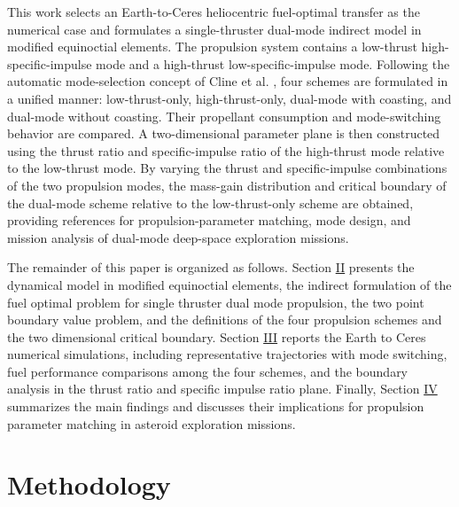 ﻿\documentclass{IEEEtaes}
\begin{document}
This work selects an Earth-to-Ceres heliocentric fuel-optimal transfer as the numerical case and formulates a single-thruster dual-mode indirect model in modified equinoctial elements. The propulsion system contains a low-thrust high-specific-impulse mode and a high-thrust low-specific-impulse mode. Following the automatic mode-selection concept of Cline et al. \cite{cline2024a}, four schemes are formulated in a unified manner: low-thrust-only, high-thrust-only, dual-mode with coasting, and dual-mode without coasting. Their propellant consumption and mode-switching behavior are compared. A two-dimensional parameter plane is then constructed using the thrust ratio and specific-impulse ratio of the high-thrust mode relative to the low-thrust mode. By varying the thrust and specific-impulse combinations of the two propulsion modes, the mass-gain distribution and critical boundary of the dual-mode scheme relative to the low-thrust-only scheme are obtained, providing references for propulsion-parameter matching, mode design, and mission analysis of dual-mode deep-space exploration missions.

The remainder of this paper is organized as follows. Section \hyperref[sec:methodology]{II} presents the dynamical model in modified equinoctial elements, the indirect formulation of the fuel optimal problem for single thruster dual mode propulsion, the two point boundary value problem, and the definitions of the four propulsion schemes and the two dimensional critical boundary. Section \hyperref[sec:simulation]{III} reports the Earth to Ceres numerical simulations, including representative trajectories with mode switching, fuel performance comparisons among the four schemes, and the boundary analysis in the thrust ratio and specific impulse ratio plane. Finally, Section \hyperref[sec:conclusions]{IV} summarizes the main findings and discusses their implications for propulsion parameter matching in asteroid exploration missions.

\section{Methodology}
\label{sec:methodology}
\end{document}
